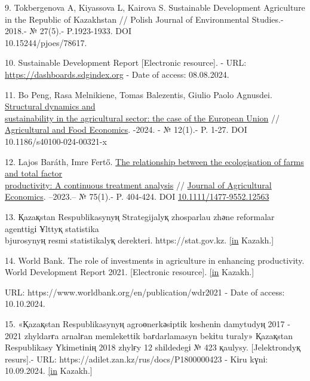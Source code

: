 \begin{references}
9. Tokbergenova A, Kiyassova L, Kairova S. Sustainable Development
Agriculture in the Republic of Kazakhstan // Polish Journal of
Environmental Studies.- 2018.- № 27(5).- P.1923-1933.
DOI \\10.15244/pjoes/78617.

10. Sustainable Development Report {[}Electronic resource{]}. -
URL: \href{https://dashboards.sdgindex.org}{https://dashboards.sdgindex.org} - Date of access: 08.08.2024.

11. Bo Peng, Rasa Melnikiene, Tomas Balezentis, Giulio Paolo Agnusdei.
\href{https://ideas.repec.org/a/spr/agfoec/v12y2024i1d10.1186_s40100-024-00321-x.html}{Structural
dynamics and \\sustainability in the agricultural sector: the case of the
European Union} //
\href{https://ideas.repec.org/s/spr/agfoec.html}{Agricultural and Food
Economics}. -2024. - № 12(1).- P. 1-27. DOI 10.1186/s40100-024-00321-x

12. Lajos Baráth, Imre Fertő.
\href{https://ideas.repec.org/a/bla/jageco/v75y2024i1p404-424.html}{The
relationship between the ecologisation of farms and total factor\\
productivity: A continuous treatment analysis} //
\href{https://ideas.repec.org/s/bla/jageco.html}{Journal of Agricultural
Economics}. --2023.-- № 75(1).- P. 404-424. DOI
\href{http://dx.doi.org/10.1111/1477-9552.12563}{10.1111/1477-9552.12563}

13. Қazaқstan Respublikasynyң Strategijalyқ zhosparlau zhәne reformalar
agenttіgі Ұlttyқ statistika \\bjurosynyң resmi statistikalyқ derekterі.
https://stat.gov.kz.
\href{https://kaz.zakon.kz/kogam-tynysy/6048484.\%20\%20\%20\%5bin}{{[}in}
Kazakh.{]}

14. World Bank. The role of investments in agriculture in enhancing
productivity. World Development Report 2021. {[}Electronic resource{]}.
\href{https://kaz.zakon.kz/kogam-tynysy/6048484.\%20\%20\%20\%5bin}{{[}in}
Kazakh.{]}

URL: https://www.worldbank.org/en/publication/wdr2021 - Date of access:
10.10.2024.

15. «Қazaқstan Respublikasynyң agroөnerkәsіptіk keshenіn damytudyң 2017
- 2021 zhyldarғa arnalғan memlekettіk baғdarlamasyn bekіtu turaly»
Қazaқstan Respublikasy Үkіmetіnің 2018 zhylғy 12 shіldedegі № 423
қaulysy. {[}Jelektrondyқ resurs{]}.- URL:
https://adilet.zan.kz/rus/docs/P1800000423 - Kіru kүnі: 10.09.2024.
\href{https://kaz.zakon.kz/kogam-tynysy/6048484.\%20\%20\%20\%5bin}{{[}in}
Kazakh.{]}


\end{references}

